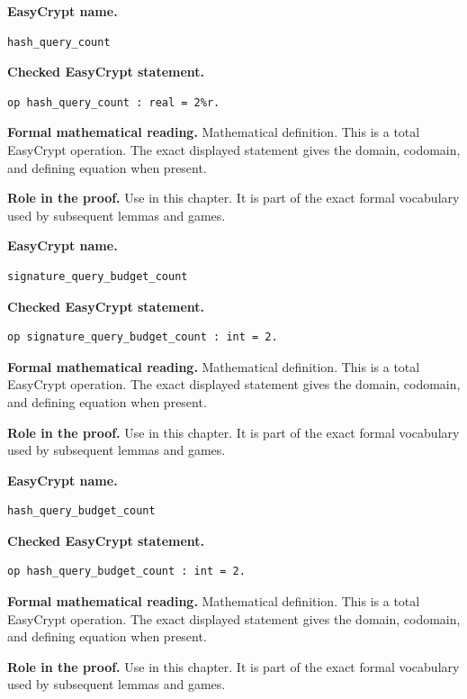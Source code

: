 \begin{formaldefinition}
\noindent\textbf{EasyCrypt name.}
\begin{lstlisting}[language=EasyCrypt,basicstyle=\ttfamily\scriptsize]
hash_query_count
\end{lstlisting}
\noindent\textbf{Checked EasyCrypt statement.}
\begin{lstlisting}[language=EasyCrypt,basicstyle=\ttfamily\scriptsize]
op hash_query_count : real = 2%r.
\end{lstlisting}
\noindent\textbf{Formal mathematical reading.}
Mathematical definition. This is a total EasyCrypt operation.  The exact displayed statement gives the domain, codomain, and defining equation when present.

\noindent\textbf{Role in the proof.}
Use in this chapter. It is part of the exact formal vocabulary used by subsequent lemmas and games.

\end{formaldefinition}

\begin{formaldefinition}
\noindent\textbf{EasyCrypt name.}
\begin{lstlisting}[language=EasyCrypt,basicstyle=\ttfamily\scriptsize]
signature_query_budget_count
\end{lstlisting}
\noindent\textbf{Checked EasyCrypt statement.}
\begin{lstlisting}[language=EasyCrypt,basicstyle=\ttfamily\scriptsize]
op signature_query_budget_count : int = 2.
\end{lstlisting}
\noindent\textbf{Formal mathematical reading.}
Mathematical definition. This is a total EasyCrypt operation.  The exact displayed statement gives the domain, codomain, and defining equation when present.

\noindent\textbf{Role in the proof.}
Use in this chapter. It is part of the exact formal vocabulary used by subsequent lemmas and games.

\end{formaldefinition}

\begin{formaldefinition}
\noindent\textbf{EasyCrypt name.}
\begin{lstlisting}[language=EasyCrypt,basicstyle=\ttfamily\scriptsize]
hash_query_budget_count
\end{lstlisting}
\noindent\textbf{Checked EasyCrypt statement.}
\begin{lstlisting}[language=EasyCrypt,basicstyle=\ttfamily\scriptsize]
op hash_query_budget_count : int = 2.
\end{lstlisting}
\noindent\textbf{Formal mathematical reading.}
Mathematical definition. This is a total EasyCrypt operation.  The exact displayed statement gives the domain, codomain, and defining equation when present.

\noindent\textbf{Role in the proof.}
Use in this chapter. It is part of the exact formal vocabulary used by subsequent lemmas and games.

\end{formaldefinition}

